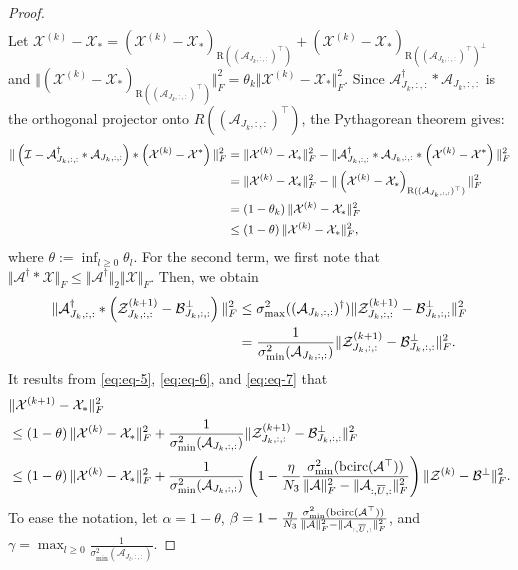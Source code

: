 \documentclass[11pt]{article}
\def\fm#1{\mathcal{#1}}
\def \a#1{\fm A_{:, #1, :}}
\def \ai#1{\fm A_{#1, :, :}}
\def \z#1#2{\fm Z^{(#1)}_{#2, :, :}}
\def \bp#1{\fm B^{\perp}_{#1, :, :}}
\def \x#1{\fm X^{(#1)}}
\begin{document}
\begin{proof}
\begin{align}
\end{align}
Let  $\x{k}-\fm X_\ast = \left( \x{k} - \fm X_\ast \right)_{\text{R}((\ai{J_k})^\top)} + \left(\x k - \fm X_\ast \right)_{\text{R}((\ai{J_k})^\top)^\perp }$ and $\Vert \left( \x{k} - \fm X_\ast \right)_{\text{R}((\ai{J_k})^\top)} \Vert_F^2  = \theta_k \Vert \x k - \fm X_\ast \Vert_F^2$. Since $\ai{J_k}^\dagger * \ai{J_k}$ is the orthogonal projector onto $R((\ai{J_k})^\top)$, the Pythagorean theorem gives:
\begin{align}
\Vert \left( \fm I - \ai{J_k}^\dagger * \ai{J_k} \right) *\left(\x k - \fm X^\ast   \right) \Vert_F^2
  & = \Vert \x k - \fm X_\ast \Vert_F^2 - \Vert \ai{J_k}^\dagger * \ai{J_k} *\left(\x k - \fm X^\ast \right) \Vert_F^2  \notag\\
  & = \Vert \x k - \fm X_\ast \Vert_F^2 - \Vert\left( \x{k} - \fm X_\ast \right)_{\text{R}((\ai{J_k})^\top)} \Vert_F^2 \notag\\
  & = \left( 1 - \theta_k \right) \Vert \x k - \fm X_\ast \Vert_F^2 \notag  \\
  & \leq \left( 1 - \theta \right) \Vert \x k - \fm X_\ast \Vert_F^2 \label{eq:eq-6},
\end{align}
where $\theta:= \inf_{l\geq 0} \theta_l$. For the second term,  we first note that $\Vert \fm A^\dagger * \fm X \Vert_F \leq \Vert \fm A^\dagger \Vert_2 \Vert \fm X \Vert_F$. Then, we obtain
\begin{align}
  \Vert  \ai{J_k}^\dagger* \left(\z{k+1}{J_k} - \bp{J_k}  \right) \Vert_F^2  & \leq \sigma_{\max}^2((\ai{J_k})^\dagger) \Vert  \z{k+1}{J_k} - \bp{J_k} \Vert_F^2 \notag\\
  & = \frac{1}{\sigma_{\min}^2(\ai{J_k})} \Vert  \z{k+1}{J_k} - \bp{J_k} \Vert_F^2.
  \label{eq:eq-7}
\end{align}
It results from  \eqref{eq:eq-5}, \eqref{eq:eq-6}, and \eqref{eq:eq-7} that
\begin{align*}
 & \Vert \x{k+1} - \fm X_\ast \Vert_F^2 \\
 &  \leq \left( 1 - \theta \right) \Vert \x k - \fm X_\ast \Vert_F^2 +  \frac{1}{\sigma_{\min}^2(\ai{J_k})} \Vert  \z{k+1}{J_k} - \bp{J_k} \Vert_F^2\\
 & \leq \left( 1 - \theta \right) \Vert \x k - \fm X_\ast \Vert_F^2 + \frac{1}{\sigma_{\min}^2(\ai{J_k})} \left( 1 - \frac{\eta}{N_3}  \frac{\sigma_{\min}^2(\bcirc(\fm A^\top))}{\Vert \fm A \Vert_F^2 - \Vert \a{\overline{U}} \Vert_F^2}   \right) \Vert  \fm Z^{(k)} - \fm B^\perp \Vert_F^2 .
\end{align*}
To ease the notation, let $\alpha = 1 - \theta$, $\beta = 1 - \frac{\eta}{N_3}  \frac{\sigma_{\min}^2(\bcirc(\fm A^\top))}{\Vert \fm A \Vert_F^2 - \Vert \a{\overline{U}} \Vert_F^2}  $, and $\gamma = \max_{l \geq 0}\frac{1}{\sigma_{\min}^2(\ai{J_l})}$.

\end{proof}
\end{document}
